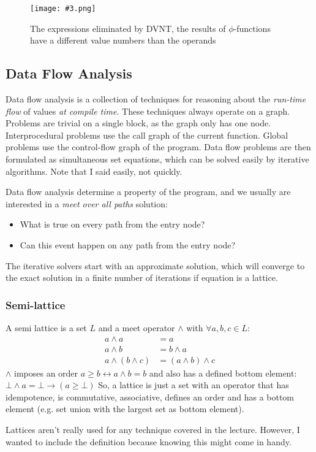\documentclass{article}
\newcommand{\fig}[4]{
	\begin{figure}[#1]
		\center
		\texttt{[image: \#3.png]}
		\caption{#4}
		\label{fig:#3}
	\end{figure}
	}
\begin{document}
\fig{h}{0.8}{dvnt}{The expressions eliminated by DVNT, the results of $\phi$-functions have a different value numbers than the operands}

\subsection{Data Flow Analysis}
Data flow analysis is a collection of techniques for reasoning about the \emph{run-time flow} of values \emph{at compile time}.
These techniques always operate on a graph.
Problems are trivial on a single block, as the graph only has one node.
Interprocedural problems use the call graph of the current function.
Global problems use the control-flow graph of the program.
Data flow problems are then formulated as simultaneous set equations, which can be solved easily by iterative algorithms.
Note that I said easily, not quickly.

Data flow analysis determine a property of the program, and we usually are interested in a \emph{meet over all paths} solution:
\begin{itemize}
	\item What is true on every path from the entry node?
	\item Can this event happen on any path from the entry node?
\end{itemize}
The iterative solvers start with an approximate solution, which will converge to the exact solution in a finite number of iterations if equation is a lattice.

\subsubsection{Semi-lattice}
A semi lattice is a set $L$ and a meet operator $\wedge$ with $\forall a,b,c \in L$:
\begin{align}
	a \wedge a &= a\\
	a \wedge b &= b \wedge a\\
	a \wedge (b \wedge c) &= (a \wedge b) \wedge c
\end{align}
$\wedge$ imposes an order $a \geq b \leftrightarrow a \wedge b = b$ and also has a defined bottom element: $\bot \wedge a = \bot \rightarrow (a \geq \bot)$
So, a lattice is just a set with an operator that has idempotence, is commutative, associative, defines an order and has a bottom element (e.g. set union with the largest set as bottom element).

Lattices aren't really used for any technique covered in the lecture.
However, I wanted to include the definition because knowing this might come in handy.
\end{document}
